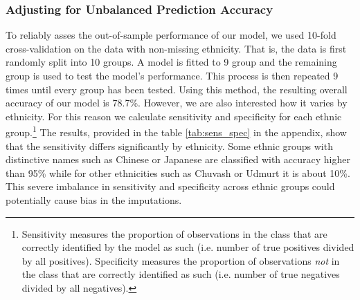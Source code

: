 \subsubsection{Adjusting for Unbalanced Prediction Accuracy} \label{subsubsec:pred_adj}
To reliably asses the out-of-sample performance of our model, we used 10-fold cross-validation on the data with non-missing ethnicity. That is, the data is first randomly split into 10 groups. A model is fitted to 9 group and the remaining group is used to test the model's performance. This process is then repeated 9 times  until every group has been tested. 
Using this method, the resulting overall accuracy of our model is 78.7\%. However,  we are also interested how it varies by ethnicity.
For this reason we calculate sensitivity and specificity for each ethnic group.\footnote{Sensitivity measures the proportion of observations in the class that are correctly identified by the model as such (i.e. number of true positives divided by all positives). Specificity measures the proportion of observations \emph{not} in the class that are correctly identified as such (i.e. number of true negatives divided by all negatives).} 
The results, provided in the table \ref{tab:sens_spec} in the appendix, show that the sensitivity differs significantly by ethnicity. 
Some ethnic groups with distinctive names such as Chinese or Japanese are classified  with accuracy higher than 95\%  while for other ethnicities such as Chuvash or Udmurt it is about 10\%. This severe imbalance in sensitivity and specificity  across ethnic groups could potentially cause bias in the imputations. 

